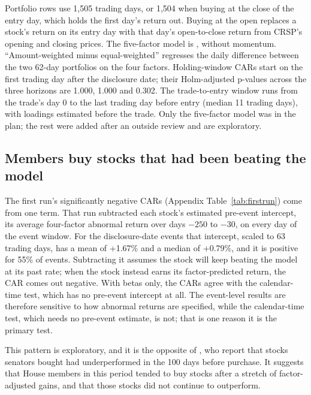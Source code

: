 \documentclass[11pt]{article}
\begin{document}
\begin{table}[H]
\smallskip
\parbox{0.9\linewidth}{\footnotesize Portfolio rows use 1,505 trading days, or 1,504 when buying at the close of the entry day, which holds the first day's return out. Buying at the open replaces a stock's return on its entry day with that day's open-to-close return from CRSP's opening and closing prices. The five-factor model is \citet{fama2015five}, without momentum. ``Amount-weighted minus equal-weighted'' regresses the daily difference between the two 62-day portfolios on the four factors. Holding-window CARs start on the first trading day after the disclosure date; their Holm-adjusted p-values across the three horizons are 1.000, 1.000 and 0.302. The trade-to-entry window runs from the trade's day 0 to the last trading day before entry (median 11 trading days), with loadings estimated before the trade. Only the five-factor model was in the plan; the rest were added after an outside review and are exploratory.}
\end{table}

\subsection{Members buy stocks that had been beating the model}\label{sec:runup}

The first run's significantly negative CARs (Appendix Table~\ref{tab:firstrun}) come from one term. That run subtracted each stock's estimated pre-event intercept, its average four-factor abnormal return over days $-250$ to $-30$, on every day of the event window. For the disclosure-date events that intercept, scaled to 63 trading days, has a mean of +1.67\% and a median of +0.79\%, and it is positive for 55\% of events. Subtracting it assumes the stock will keep beating the model at its past rate; when the stock instead earns its factor-predicted return, the CAR comes out negative. With betas only, the CARs agree with the calendar-time test, which has no pre-event intercept at all. The event-level results are therefore sensitive to how abnormal returns are specified, while the calendar-time test, which needs no pre-event estimate, is not; that is one reason it is the primary test.

This pattern is exploratory, and it is the opposite of \citet{belmont2020relief}, who report that stocks senators bought had underperformed in the 100 days before purchase. It suggests that House members in this period tended to buy stocks after a stretch of factor-adjusted gains, and that those stocks did not continue to outperform.
\end{document}

